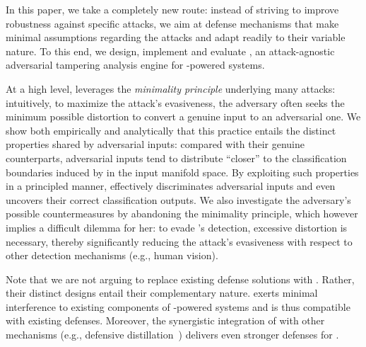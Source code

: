 In this paper, we take a completely new route: instead of striving to improve \dnn robustness against specific attacks, we aim at defense mechanisms that make minimal assumptions regarding the attacks and adapt readily to their variable nature. To this end, we design, implement and evaluate \system, an attack-agnostic adversarial tampering analysis engine for \dl-powered systems.

At a high level, \system leverages the {\em minimality principle} underlying many attacks: intuitively, to maximize the attack's evasiveness, the adversary often seeks the minimum possible distortion to convert a genuine input to an adversarial one. We show both empirically and analytically that this practice entails the distinct properties shared by adversarial inputs: compared with their genuine counterparts, adversarial inputs tend to distribute ``closer'' to the classification boundaries induced by \dnns in the input manifold space.
%
By exploiting such properties in a principled manner, \system effectively discriminates adversarial inputs and even uncovers their correct classification outputs. We also investigate the adversary's possible countermeasures by abandoning the minimality principle, which however implies a difficult dilemma for her: to evade \system's detection, excessive distortion is necessary, thereby significantly reducing the attack's evasiveness with respect to other detection mechanisms (e.g., human vision).



Note that we are not arguing to replace existing defense solutions with \system. Rather, their distinct designs entail their complementary nature. \system exerts minimal interference to existing components of \dl-powered systems and is thus compatible with existing defenses. Moreover, the synergistic integration of \system with other mechanisms (e.g., defensive distillation~\cite{Papernot:2016:sp}) delivers even stronger defenses for \dnns.

